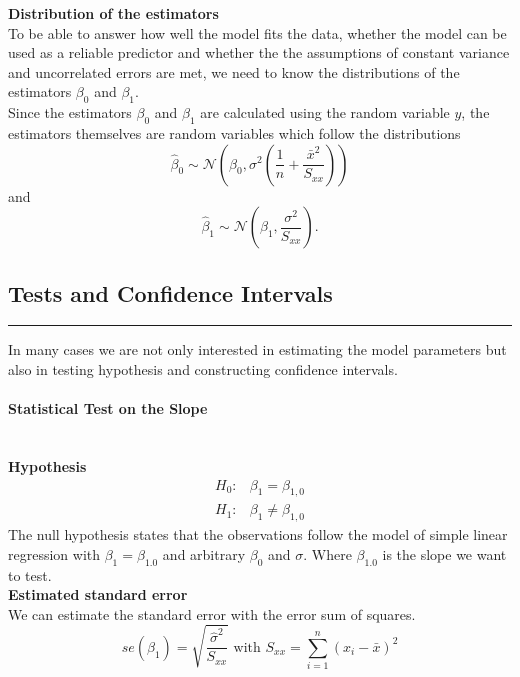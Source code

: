 \textbf{Distribution of the estimators}\\
To be able to answer how well the model fits the data, whether the model can be used as a reliable predictor and whether the the assumptions of constant variance and uncorrelated errors are met, we need to know the distributions of the estimators $\beta_0$ and $\beta_1$.\\
Since the estimators $\beta_0$ and $\beta_1$ are calculated using the random variable $y$, the estimators themselves are random variables which follow the distributions
\begin{equation}
  \hat{\beta}_0 \sim \mathcal{N}\left(\beta_0, \sigma^2\left(\frac{1}{n} + \frac{\bar{x}^2}{S_{xx}}\right)\right)
\end{equation}
and
\begin{equation}
  \hat{\beta}_1 \sim \mathcal{N}\left(\beta_1, \frac{\sigma^2}{S_{xx}}\right).
\end{equation}

\subsection{Tests and Confidence Intervals}
\noindent\rule[\linienAbstand]{\linewidth}{\linienDicke}
In many cases we are not only interested in estimating the model parameters but also in testing hypothesis and constructing confidence intervals.\\

\paragraph{Statistical Test on the Slope}\mbox{}\\
\textbf{Hypothesis}
\begin{equation}
  \begin{split}
    H_0:& \beta_1 = \beta_{1,0}\\
    H_1:& \beta_1 \neq \beta_{1,0}
  \end{split}
\end{equation}
The null hypothesis states that the observations follow the model of simple linear regression with $\beta_{1} = \beta_{1.0}$ and arbitrary $\beta_0$ and $\sigma$. Where $\beta_{1.0}$ is the slope we want to test.\\

\textbf{Estimated standard error}\\
We can estimate the standard error with the error sum of squares.
\begin{equation}
  se(\hat{\beta}_1) = \sqrt{\frac{\hat{\sigma}^2}{S_{xx}}} \text{    with    } S_{xx} =  \sum^n_{i=1}(x_i - \bar{x})^2
\end{equation}

